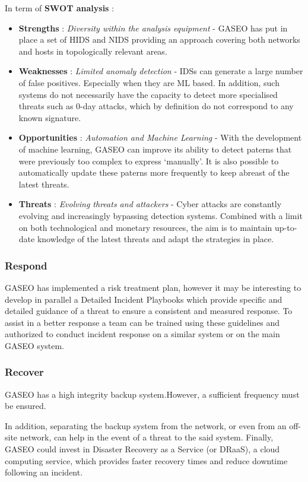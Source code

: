 \documentclass[12pt]{article}
\begin{document}
In term of \textbf{SWOT analysis} : 
\begin{itemize}
    \item \textbf{Strengths} : \textit{Diversity within the analysis equipment} - GASEO has put in place a set of HIDS and NIDS providing an approach covering both networks and hosts in topologically relevant areas.
    \item \textbf{Weaknesses} : \textit{Limited anomaly detection} - IDSs can generate a large number of false positives. Especially when they are ML based. In addition, such systems do not necessarily have the capacity to detect more specialised threats such as 0-day attacks, which by definition do not correspond to any known signature.
    \item \textbf{Opportunities} : \textit{Automation and Machine Learning} - With the development of machine learning, GASEO can improve its ability to detect paterns that were previously too complex to express ‘manually’. It is also possible to automatically update these paterns more frequently to keep abreast of the latest threats.
    \item \textbf{Threats} : \textit{Evolving threats and attackers} - Cyber attacks are constantly evolving and increasingly bypassing detection systems. Combined with a limit on both technological and monetary resources, the aim is to maintain up-to-date knowledge of the latest threats and adapt the strategies in place.
\end{itemize}


\subsubsection*{Respond}
GASEO has implemented a risk treatment plan, however it may be interesting to develop in parallel a Detailed Incident Playbooks which provide specific and detailed guidance of a threat to ensure a consistent and measured response. To assist in a better response a team can be trained using these guidelines and authorized to conduct incident response on a similar system or on the main GASEO system.

\subsubsection*{Recover}
GASEO has a high integrity backup system.However, a sufficient frequency must be ensured.

In addition, separating the backup system from the network, or even from an off-site network, can help in the event of a threat to the said system.
Finally, GASEO could invest in Disaster Recovery as a Service (or DRaaS), a cloud computing service, which provides faster recovery times and reduce downtime following an incident.
\end{document}
